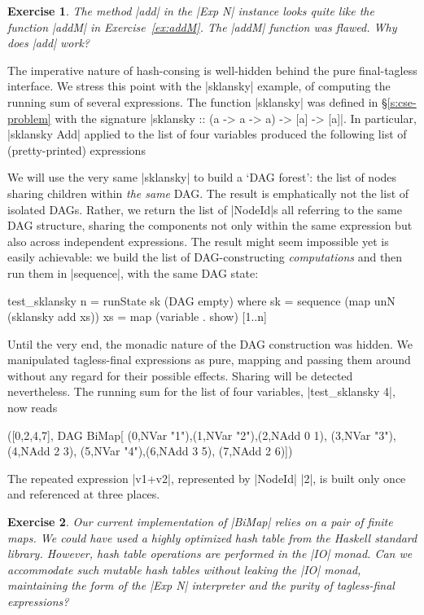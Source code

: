 \documentclass[submission,copyright,creativecommons]{eptcs}
\newtheorem{Exercise}{Exercise} \newcommand\aside[1]{}
\begin{document}
\begin{Exercise}
The method |add| in the |Exp N| instance looks quite like
the function |addM| in Exercise~\ref{ex:addM}. The |addM| function
was flawed. Why does |add| work?
\end{Exercise}

The imperative nature of hash-consing is well-hidden behind the pure
final-tagless interface. We stress this point with the |sklansky|
example, of computing the running sum of several expressions. 
The function |sklansky| was defined in \S\ref{s:cse-problem} with the signature
|sklansky :: (a -> a -> a) -> [a] -> [a]|. In particular,
|sklansky Add| applied to the list of four variables produced the
following list of (pretty-printed) expressions
\begin{code}
["v1","(v1+v2)","((v1+v2)+v3)","((v1+v2)+(v3+v4))"]
\end{code}

We will use the very same |sklansky| to build a `DAG
forest': the list of nodes sharing children within \emph{the same}
DAG. The result is emphatically not the list of isolated
DAGs. Rather, we return the list of |NodeId|s all referring to the
same DAG structure, sharing the components not only within the same
expression but also across independent expressions. The result might
seem impossible yet is easily achievable: we build the list of
DAG-constructing \emph{computations} and then run them in
|sequence|, with the same DAG state:
\begin{code}
test_sklansky n = runState sk (DAG empty)
  where
  sk = sequence (map unN (sklansky add xs))
  xs = map (variable . show) [1..n]
\end{code}
Until the very end, the monadic nature of the DAG construction was
hidden. We manipulated tagless-final expressions as pure, mapping and
passing them around without any regard for their possible effects.
Sharing will be detected nevertheless. The running sum for the list
of four variables, |test_sklansky 4|, now reads
\begin{code}
([0,2,4,7],
  DAG BiMap[
    (0,NVar "1"),(1,NVar "2"),(2,NAdd 0 1),
    (3,NVar "3"),(4,NAdd 2 3),
    (5,NVar "4"),(6,NAdd 3 5),
    (7,NAdd 2 6)])
\end{code}
The repeated expression |v1+v2|, represented by |NodeId|
|2|, is built only once and referenced at three places.

\begin{Exercise}
Our current implementation of |BiMap| relies on a pair of finite maps. We
could have used a highly optimized hash table from the Haskell standard
library. However, hash table operations are performed in the |IO|
monad. Can we accommodate such mutable hash tables without leaking the
|IO| monad, maintaining the form of the |Exp N| interpreter and the
purity of tagless-final expressions?
\end{Exercise}
\end{document}
